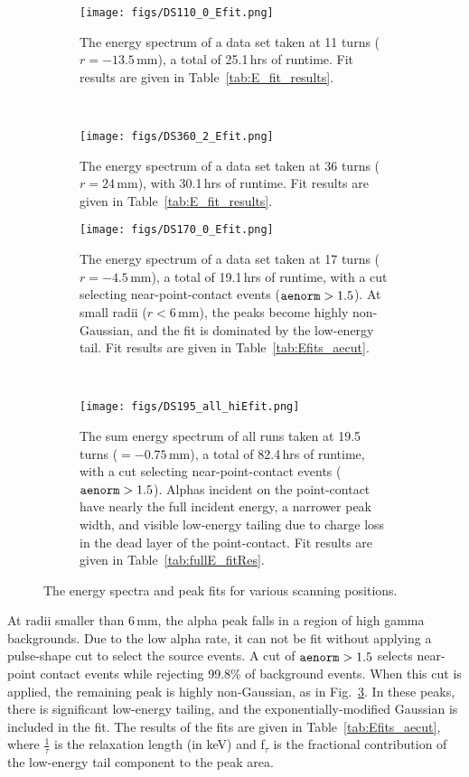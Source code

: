 \documentclass[groupedaddress,rmp,amsmath,amssymb,bibnotes,altaffilletter,twocolumn]{revtex4-1}
\begin{document}
\begin{figure*}[]
 \centering
  \begin{subfigure}[]{.45\textwidth}
 \texttt{[image: figs/DS110\_0\_Efit.png]}
  \caption{The energy spectrum of a data set taken at 11 turns ($r= -13.5$\,mm), a total of 25.1\,hrs of runtime. Fit results are given in Table~\ref{tab:E_fit_results}.}
 \label{fig:Efit_110}
\end{subfigure}
~
  \begin{subfigure}[]{.45\textwidth}
 \texttt{[image: figs/DS360\_2\_Efit.png]}
  \caption{The energy spectrum of a data set taken at 36 turns ($r = 24$\,mm), with 30.1\,hrs of runtime. Fit results are given in Table~\ref{tab:E_fit_results}.}
 \label{fig:Efit_360}
\end{subfigure}

 \begin{subfigure}[]{.45\textwidth}
 \texttt{[image: figs/DS170\_0\_Efit.png]}
  \caption{The energy spectrum of a data set taken at 17 turns ($r = -4.5$\,mm), a total of 19.1\,hrs of runtime, with a cut selecting near-point-contact events (${\tt aenorm} > 1.5$). At small radii ($r<6$\,mm), the peaks become highly non-Gaussian, and the fit is dominated by the low-energy tail. Fit results are given in Table~\ref{tab:Efits_aecut}.}
 \label{fig:Efit_170}
\end{subfigure}
~
 \begin{subfigure}[]{.45\textwidth}
 \texttt{[image: figs/DS195\_all\_hiEfit.png]}
 \caption{The sum energy spectrum of all runs taken at 19.5 turns ($ = -0.75$\,mm), a total of 82.4\,hrs of runtime, with a cut selecting near-point-contact events (${\tt aenorm} > 1.5$). Alphas incident on the point-contact have nearly the full incident energy, a narrower peak width, and visible low-energy tailing due to charge loss in the dead layer of the point-contact. Fit results are given in Table~\ref{tab:fullE_fitRes}.}
 \label{fig:Efit_195}
\end{subfigure}
 \caption{The energy spectra and peak fits for various scanning positions.} 
 \label{fig:Epeaks}
\end{figure*}

At radii smaller than 6\,mm, the alpha peak falls in a region of high gamma backgrounds. Due to the low alpha rate, it can not be fit without applying a pulse-shape cut to select the source events. A cut of ${\tt aenorm} >1.5$ selects near-point contact events while rejecting 99.8\% of background events. When this cut is applied, the remaining peak is highly non-Gaussian, as in Fig.~\ref{fig:Efit_170}. In these peaks, there is significant low-energy tailing, and the exponentially-modified Gaussian is included in the fit. The results of the fits are given in Table~\ref{tab:Efits_aecut}, where $\frac{1}{\tau}$ is the relaxation length (in keV) and  f$_{\tau}$ is the fractional contribution of the low-energy tail component to the peak area.
\end{document}

